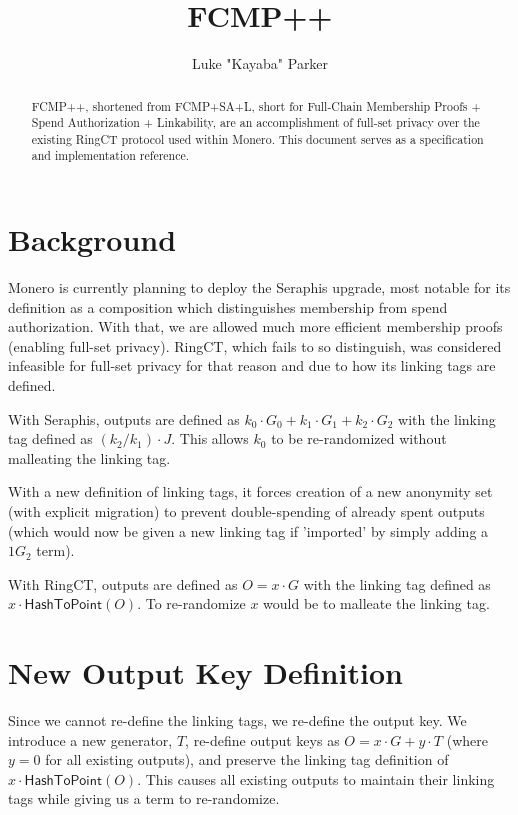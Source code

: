 \documentclass[]{article}
\title{FCMP++}
\author{Luke "Kayaba" Parker}
\begin{document}
\maketitle

\begin{abstract}
	
	FCMP++, shortened from FCMP+SA+L, short for Full-Chain Membership Proofs + Spend Authorization + Linkability, are an accomplishment of full-set privacy over the existing RingCT protocol used within Monero. This document serves as a specification and implementation reference.

\end{abstract}

\section{Background}

\newcommand{\hashtopoint}{\mathsf{HashToPoint}}

Monero is currently planning to deploy the Seraphis upgrade, most notable for its definition as a composition which distinguishes membership from spend authorization. With that, we are allowed much more efficient membership proofs (enabling full-set privacy). RingCT, which fails to so distinguish, was considered infeasible for full-set privacy for that reason and due to how its linking tags are defined.

With Seraphis, outputs are defined as $k_0 \cdot G_0 + k_1 \cdot G_1 + k_2 \cdot G_2$ with the linking tag defined as $(k_2 / k_1) \cdot J$. This allows $k_0$ to be re-randomized without malleating the linking tag.

With a new definition of linking tags, it forces creation of a new anonymity set (with explicit migration) to prevent double-spending of already spent outputs (which would now be given a new linking tag if 'imported' by simply adding a $1 G_2$ term).

With RingCT, outputs are defined as $O = x \cdot G$ with the linking tag defined as $x \cdot \hashtopoint(O)$. To re-randomize $x$ would be to malleate the linking tag.

\section{New Output Key Definition}

Since we cannot re-define the linking tags, we re-define the output key. We introduce a new generator, $T$, re-define output keys as $O = x \cdot G + y \cdot T$ (where $y = 0$ for all existing outputs), and preserve the linking tag definition of $x \cdot \hashtopoint(O)$. This causes all existing outputs to maintain their linking tags while giving us a term to re-randomize.
\end{document}
